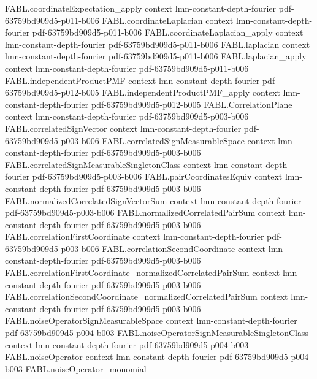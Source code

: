 \begin{theorem}
\proofstep
  {FABL.coordinateExpectation_apply}
  {context}
  {lmn-constant-depth-fourier}
  {pdf-63759bd909d5-p011-b006}
\proofstep
  {FABL.coordinateLaplacian}
  {context}
  {lmn-constant-depth-fourier}
  {pdf-63759bd909d5-p011-b006}
\proofstep
  {FABL.coordinateLaplacian_apply}
  {context}
  {lmn-constant-depth-fourier}
  {pdf-63759bd909d5-p011-b006}
\proofstep
  {FABL.laplacian}
  {context}
  {lmn-constant-depth-fourier}
  {pdf-63759bd909d5-p011-b006}
\proofstep
  {FABL.laplacian_apply}
  {context}
  {lmn-constant-depth-fourier}
  {pdf-63759bd909d5-p011-b006}
\proofstep
  {FABL.independentProductPMF}
  {context}
  {lmn-constant-depth-fourier}
  {pdf-63759bd909d5-p012-b005}
\proofstep
  {FABL.independentProductPMF_apply}
  {context}
  {lmn-constant-depth-fourier}
  {pdf-63759bd909d5-p012-b005}
\proofstep
  {FABL.CorrelationPlane}
  {context}
  {lmn-constant-depth-fourier}
  {pdf-63759bd909d5-p003-b006}
\proofstep
  {FABL.correlatedSignVector}
  {context}
  {lmn-constant-depth-fourier}
  {pdf-63759bd909d5-p003-b006}
\proofstep
  {FABL.correlatedSignMeasurableSpace}
  {context}
  {lmn-constant-depth-fourier}
  {pdf-63759bd909d5-p003-b006}
\proofstep
  {FABL.correlatedSignMeasurableSingletonClass}
  {context}
  {lmn-constant-depth-fourier}
  {pdf-63759bd909d5-p003-b006}
\proofstep
  {FABL.pairCoordinatesEquiv}
  {context}
  {lmn-constant-depth-fourier}
  {pdf-63759bd909d5-p003-b006}
\proofstep
  {FABL.normalizedCorrelatedSignVectorSum}
  {context}
  {lmn-constant-depth-fourier}
  {pdf-63759bd909d5-p003-b006}
\proofstep
  {FABL.normalizedCorrelatedPairSum}
  {context}
  {lmn-constant-depth-fourier}
  {pdf-63759bd909d5-p003-b006}
\proofstep
  {FABL.correlationFirstCoordinate}
  {context}
  {lmn-constant-depth-fourier}
  {pdf-63759bd909d5-p003-b006}
\proofstep
  {FABL.correlationSecondCoordinate}
  {context}
  {lmn-constant-depth-fourier}
  {pdf-63759bd909d5-p003-b006}
\proofstep
  {FABL.correlationFirstCoordinate_normalizedCorrelatedPairSum}
  {context}
  {lmn-constant-depth-fourier}
  {pdf-63759bd909d5-p003-b006}
\proofstep
  {FABL.correlationSecondCoordinate_normalizedCorrelatedPairSum}
  {context}
  {lmn-constant-depth-fourier}
  {pdf-63759bd909d5-p003-b006}
\proofstep
  {FABL.noiseOperatorSignMeasurableSpace}
  {context}
  {lmn-constant-depth-fourier}
  {pdf-63759bd909d5-p004-b003}
\proofstep
  {FABL.noiseOperatorSignMeasurableSingletonClass}
  {context}
  {lmn-constant-depth-fourier}
  {pdf-63759bd909d5-p004-b003}
\proofstep
  {FABL.noiseOperator}
  {context}
  {lmn-constant-depth-fourier}
  {pdf-63759bd909d5-p004-b003}
\proofstep
  {FABL.noiseOperator_monomial}

\end{theorem}
